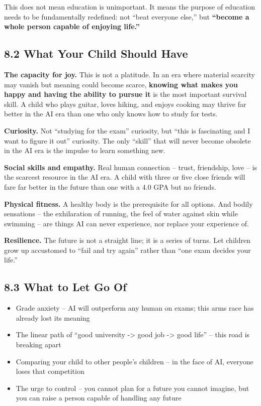 This does not mean education is unimportant. It means the purpose of
education needs to be fundamentally redefined: not ``beat everyone
else,'' but \textbf{``become a whole person capable of enjoying life.''}

\subsection{8.2 What Your Child Should
Have}\label{what-your-child-should-have}

\textbf{The capacity for joy.} This is not a platitude. In an era where
material scarcity may vanish but meaning could become scarce,
\textbf{knowing what makes you happy and having the ability to pursue
it} is the most important survival skill. A child who plays guitar,
loves hiking, and enjoys cooking may thrive far better in the AI era
than one who only knows how to study for tests.

\textbf{Curiosity.} Not ``studying for the exam'' curiosity, but ``this
is fascinating and I want to figure it out'' curiosity. The only
``skill'' that will never become obsolete in the AI era is the impulse
to learn something new.

\textbf{Social skills and empathy.} Real human connection -- trust,
friendship, love -- is the scarcest resource in the AI era. A child with
three or five close friends will fare far better in the future than one
with a 4.0 GPA but no friends.

\textbf{Physical fitness.} A healthy body is the prerequisite for all
options. And bodily sensations -- the exhilaration of running, the feel
of water against skin while swimming -- are things AI can never
experience, nor replace your experience of.

\textbf{Resilience.} The future is not a straight line; it is a series
of turns. Let children grow up accustomed to ``fail and try again''
rather than ``one exam decides your life.''

\subsection{8.3 What to Let Go Of}\label{what-to-let-go-of}

\begin{itemize}
\tightlist
\item
  Grade anxiety -- AI will outperform any human on exams; this arms race
  has already lost its meaning
\item
  The linear path of ``good university -\textgreater{} good job
  -\textgreater{} good life'' -- this road is breaking apart
\item
  Comparing your child to other people's children -- in the face of AI,
  everyone loses that competition
\item
  The urge to control -- you cannot plan for a future you cannot
  imagine, but you can raise a person capable of handling any future
\end{itemize}


